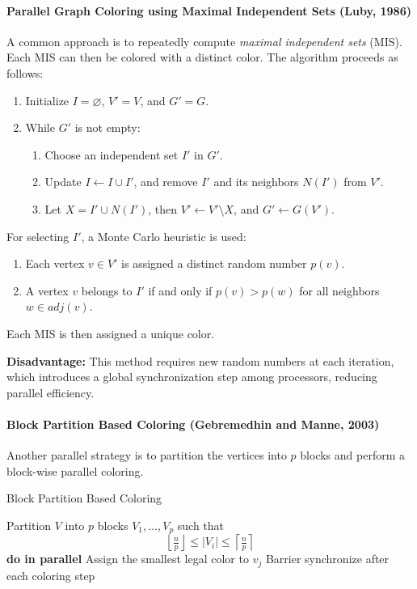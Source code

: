 \documentclass[12pt]{book}
\begin{document}
\paragraph{Parallel Graph Coloring using Maximal Independent Sets (Luby, 1986)}  
A common approach is to repeatedly compute \emph{maximal independent sets} (MIS). Each MIS can then be colored with a distinct color. The algorithm proceeds as follows:
\begin{enumerate}
    \item Initialize $I = \varnothing$, $V' = V$, and $G' = G$.
    \item While $G'$ is not empty:
    \begin{enumerate}
        \item Choose an independent set $I'$ in $G'$.
        \item Update $I \gets I \cup I'$, and remove $I'$ and its neighbors $N(I')$ from $V'$.
        \item Let $X = I' \cup N(I')$, then $V' \gets V' \setminus X$, and $G' \gets G(V')$.
    \end{enumerate}
\end{enumerate}

For selecting $I'$, a Monte Carlo heuristic is used:
\begin{enumerate}
    \item Each vertex $v \in V'$ is assigned a distinct random number $p(v)$.
    \item A vertex $v$ belongs to $I'$ if and only if $p(v) > p(w)$ for all neighbors $w \in adj(v)$.
\end{enumerate}
Each MIS is then assigned a unique color.  

\textbf{Disadvantage:} This method requires new random numbers at each iteration, which introduces a global synchronization step among processors, reducing parallel efficiency.  

\paragraph{Block Partition Based Coloring (Gebremedhin and Manne, 2003)}  
Another parallel strategy is to partition the vertices into $p$ blocks and perform a block-wise parallel coloring.  

\begin{algorithm}[H]
\caption{Block Partition Based Coloring}
\label{alg:block-partition-coloring}
\begin{algorithmic}[1]
    \State Partition $V$ into $p$ blocks $V_1, \ldots, V_p$ such that 
    \[
    \left\lfloor \tfrac{n}{p} \right\rfloor \leq |V_i| \leq \left\lceil \tfrac{n}{p} \right\rceil
    \]
     \textbf{do in parallel}
         
            \State Assign the smallest legal color to $v_j$
            \State Barrier synchronize after each coloring step
        \EndFor
    \EndFor
\EndFunction
\end{algorithmic}
\end{algorithm}
\end{document}
